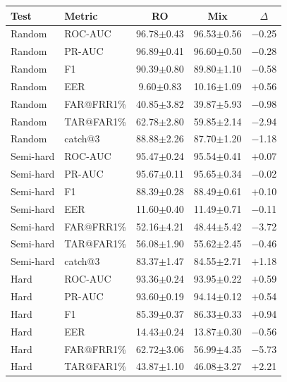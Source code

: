 \documentclass[11pt]{article}
\begin{document}
\begin{table}[!t]
\centering
\scriptsize
\begin{minipage}[t]{0.48\textwidth}
\centering
\begin{tabular}{l l c c c}
\toprule
\textbf{Test} & \textbf{Metric} & \textbf{RO} & \textbf{Mix} & \textbf{$\Delta$} \\
\midrule
Random    & ROC-AUC    & 96.78$\pm$0.43 & 96.53$\pm$0.56 & $-$0.25 \\
Random    & PR-AUC     & 96.89$\pm$0.41 & 96.60$\pm$0.50 & $-$0.28 \\
Random    & F1         & 90.39$\pm$0.80 & 89.80$\pm$1.10 & $-$0.58 \\
Random    & EER        & \phantom{0}9.60$\pm$0.83 & 10.16$\pm$1.09 & $+$0.56 \\
Random    & FAR@FRR1\% & 40.85$\pm$3.82 & 39.87$\pm$5.93 & $-$0.98 \\
Random    & TAR@FAR1\% & 62.78$\pm$2.80 & 59.85$\pm$2.14 & $-$2.94 \\
Random    & catch@3    & 88.88$\pm$2.26 & 87.70$\pm$1.20 & $-$1.18 \\
\midrule
Semi-hard & ROC-AUC    & 95.47$\pm$0.24 & 95.54$\pm$0.41 & $+$0.07 \\
Semi-hard & PR-AUC     & 95.67$\pm$0.11 & 95.65$\pm$0.34 & $-$0.02 \\
Semi-hard & F1         & 88.39$\pm$0.28 & 88.49$\pm$0.61 & $+$0.10 \\
Semi-hard & EER        & 11.60$\pm$0.40 & 11.49$\pm$0.71 & $-$0.11 \\
Semi-hard & FAR@FRR1\% & 52.16$\pm$4.21 & 48.44$\pm$5.42 & $-$3.72 \\
Semi-hard & TAR@FAR1\% & 56.08$\pm$1.90 & 55.62$\pm$2.45 & $-$0.46 \\
Semi-hard & catch@3    & 83.37$\pm$1.47 & 84.55$\pm$2.71 & $+$1.18 \\
\midrule
Hard      & ROC-AUC    & 93.36$\pm$0.24 & 93.95$\pm$0.22 & $+$0.59 \\
Hard      & PR-AUC     & 93.60$\pm$0.19 & 94.14$\pm$0.12 & $+$0.54 \\
Hard      & F1         & 85.39$\pm$0.37 & 86.33$\pm$0.33 & $+$0.94 \\
Hard      & EER        & 14.43$\pm$0.24 & 13.87$\pm$0.30 & $-$0.56 \\
Hard      & FAR@FRR1\% & 62.72$\pm$3.06 & 56.99$\pm$4.35 & $-$5.73 \\
Hard      & TAR@FAR1\% & 43.87$\pm$1.10 & 46.08$\pm$3.27 & $+$2.21 \\

\end{tabular}
\end{minipage}
\end{table}
\end{document}
